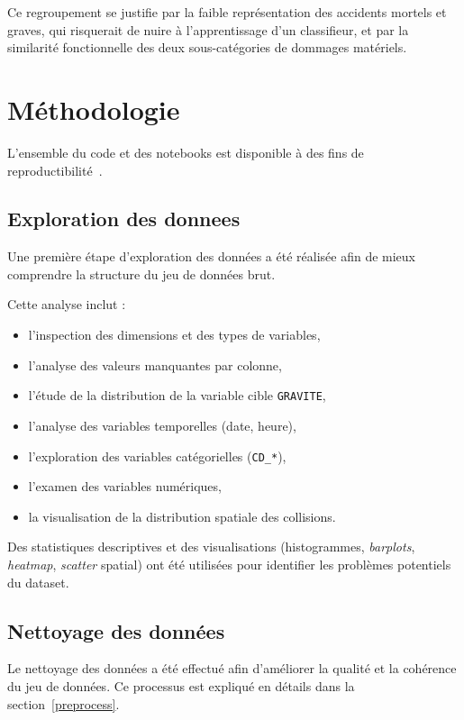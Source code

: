 \documentclass[11pt]{article}
\begin{document}
Ce regroupement se justifie par la faible représentation des accidents
mortels et graves, qui risquerait de nuire à l'apprentissage d'un
classifieur, et par la similarité fonctionnelle des deux sous-catégories
de dommages matériels.
 
\section{Méthodologie}

 
L'ensemble du code et des notebooks est disponible à des fins de reproductibilité~\cite{repo_projet}.
 
\subsection{Exploration des donnees}
Une première étape d'exploration des données a été réalisée afin de mieux comprendre la structure du jeu de données brut.

Cette analyse inclut :
\begin{itemize}
    \item l'inspection des dimensions et des types de variables,
    \item l'analyse des valeurs manquantes par colonne,
    \item l'étude de la distribution de la variable cible \texttt{GRAVITE},
    \item l'analyse des variables temporelles (date, heure),
    \item l'exploration des variables catégorielles (\texttt{CD\_*}),
    \item l'examen des variables numériques,
    \item la visualisation de la distribution spatiale des collisions.
\end{itemize}

Des statistiques descriptives et des visualisations (histogrammes, \textit{barplots}, \textit{heatmap}, \textit{scatter} spatial) ont été utilisées pour identifier les problèmes potentiels du dataset.
 
\subsection{Nettoyage des données}

Le nettoyage des données a été effectué afin d'améliorer la qualité et la cohérence du jeu de données. Ce processus est expliqué en détails dans la section~\ref{preprocess}.
\end{document}
